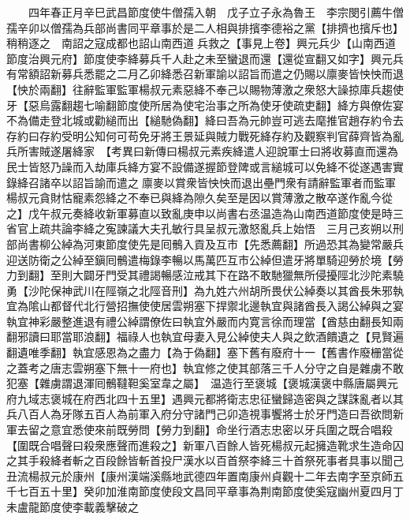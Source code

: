 　　四年春正月辛巳武昌節度使牛僧孺入朝　戊子立子永為魯王　李宗閔引薦牛僧孺辛卯以僧孺為兵部尚書同平章事於是二人相與排擯李德裕之黨【排擠也擯斥也】稍稍逐之　南詔之寇成都也詔山南西道兵救之【事見上卷】興元兵少【山南西道節度治興元府】節度使李絳募兵千人赴之未至蠻退而還【還從宣翻又如字】興元兵有常額詔新募兵悉罷之二月乙卯絳悉召新軍諭以詔旨而遣之仍賜以廪麥皆怏怏而退【怏於兩翻】往辭監軍監軍楊叔元素惡絳不奉己以賜物薄激之衆怒大譟掠庫兵趨使牙【惡烏露翻趨七喻翻節度使所居為使宅治事之所為使牙使疏吏翻】絳方與僚佐宴不為備走登北城或勸縋而出【縋馳偽翻】絳曰吾為元帥豈可逃去麾推官趙存約令去存約曰存約受明公知何可苟免牙將王景延與賊力戰死絳存約及觀察判官薛齊皆為亂兵所害賊遂屠絳家　【考異曰新傳曰楊叔元素疾絳遣人迎說軍士曰將收募直而還為民士皆怒乃譟而入劫庫兵絳方宴不設備遂握節登陴或言縋城可以免絳不從遂遇害實錄絳召諸卒以詔旨諭而遣之廪麥以賞衆皆怏怏而退出壘門衆有請辭監軍者而監軍楊叔元貪財怙寵素怨絳之不奉已與絳為隙久矣至是因以賞薄激之散卒遂作亂今從之】戊午叔元奏絳收新軍募直以致亂庚申以尚書右丞温造為山南西道節度使是時三省官上疏共論李絳之寃諫議大夫孔敏行具呈叔元激怒亂兵上始悟　三月己亥朔以刑部尚書柳公綽為河東節度使先是囘鶻入貢及互市【先悉薦翻】所過恐其為變常嚴兵迎送防衛之公綽至鎭囘鶻遣梅錄李暢以馬萬匹互市公綽但遣牙將單騎迎勞於境【勞力到翻】至則大闢牙門受其禮謁暢感泣戒其下在路不敢馳獵無所侵擾陘北沙陀素驍勇【沙陀保神武川在陘嶺之北陘音刑】為九姓六州胡所畏伏公綽奏以其酋長朱邪執宜為隂山都督代北行營招撫使使居雲朔塞下捍禦北邊執宜與諸酋長入謁公綽與之宴執宜神彩嚴整進退有禮公綽謂僚佐曰執宜外嚴而内寛言徐而理當【酋慈由翻長知兩翻邪讀曰耶當耶浪翻】福祿人也執宜母妻入見公綽使夫人與之飲酒饋遺之【見賢遍翻遺唯季翻】執宜感恩為之盡力【為于偽翻】塞下舊有廢府十一【舊書作廢栅當從之蓋考之唐志雲朔塞下無十一府也】執宜修之使其部落三千人分守之自是雜虜不敢犯塞【雜虜謂退渾囘鶻韃靼奚室韋之屬】　温造行至褒城【褒城漢褒中縣唐屬興元府九域志褒城在府西北四十五里】遇興元都將衛志忠征蠻歸造密與之謀誅亂者以其兵八百人為牙隊五百人為前軍入府分守諸門己卯造視事饗將士於牙門造曰吾欲問新軍去留之意宜悉使來前既勞問【勞力到翻】命坐行酒志忠密以牙兵圍之既合唱殺【圍既合唱聲曰殺衆應聲而進殺之】新軍八百餘人皆死楊叔元起擁造靴求生造命囚之其手殺絳者斬之百段餘皆斬首投尸漢水以百首祭李絳三十首祭死事者具事以聞己丑流楊叔元於康州【康州漢端溪縣地武德四年置南康州貞觀十二年去南字至京師五千七百五十里】癸卯加淮南節度使段文昌同平章事為荆南節度使奚寇幽州夏四月丁未盧龍節度使李載義擊破之

